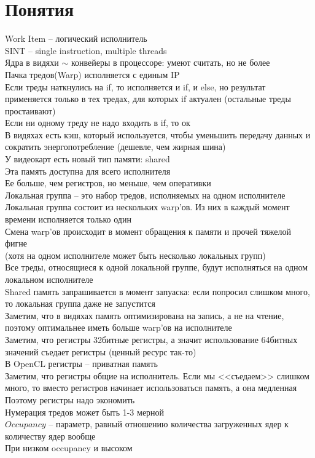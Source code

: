 \documentclass[12pt]{article}
\begin{document}
\section{Понятия}
Work Item -- логический исполнитель\\
SINT -- single instruction, multiple threads\\
Ядра в видяхи $\sim$ конвейеры в процессоре: умеют считать, но не более\\
Пачка тредов(Warp) исполняется с единым IP\\
Если треды наткнулись на if, то исполняется и if, и else, но результат применяется только в тех тредах, для которых if актуален (остальные треды простаивают)\\
Если ни одному треду не надо входить в if, то ок\\
В видяхах есть кэш, который используется, чтобы уменьшить передачу данных и сократить энергопотребление (дешевле, чем жирная шина)\\
У видеокарт есть новый тип памяти: shared\\
Эта память доступна для всего исполнителя\\
Ее больше, чем регистров, но меньше, чем оперативки\\
Локальная группа -- это набор тредов, исполняемых на одном исполнителе\\
Локальная группа состоит из нескольких warp'ов. Из них в каждый момент времени исполняется только один\\
Смена warp'ов происходит в момент обращения к памяти и прочей тяжелой фигне\\
(хотя на одном исполнителе может быть несколько локальных групп)\\
Все треды, относящиеся к одной локальной группе, будут исполняться на одном локальном исполнителе\\
Shared память запрашивается в момент запуаска: если попросил слишком много, то локальная группа даже не запустится\\
Заметим, что в видяхах память оптимизирована на запись, а не на чтение, поэтому оптимальнее иметь больше warp'ов на исполнителе\\
Заметим, что регистры 32битные регистры, а значит использование 64битных значений съедает регистры (ценный ресурс так-то)\\
В OpenCL регистры -- приватная память\\
Заметим, что регистры общие на исполнитель. Если мы <<съедаем>> слишком много, то вместо регистров начинает использоваться память, а она медленная\\
Поэтому регистры надо экономить\\
Нумерация тредов может быть 1-3 мерной\\
$Occupancy$ -- параметр, равный отношению количества загруженных ядер к количеству ядер вообще\\
При низком occupancy и высоком 
\end{document}
